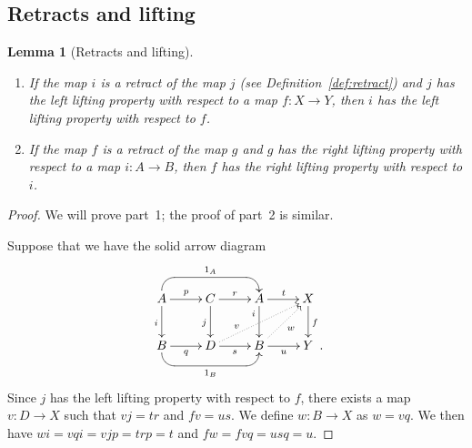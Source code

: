 \documentclass[12pt]{amsart}
\numberwithin{equation}{section}
\theoremstyle{slplain}
\newtheorem{lem}[equation]{Lemma}
\theoremstyle{definition}
\theoremstyle{remark}
\newcommand{\defref}{Definition~\ref}
\newcommand{\Period}{\rlap{\enspace .}}
\begin{document}
\subsection{Retracts and lifting}
\label{sec:RetLft}


\begin{lem}[Retracts and lifting]
  \label{lem:retractLLP}
  \leavevmode
  \begin{enumerate}
  \item If the map $i$ is a retract of the map $j$ (see
    \defref{def:retract}) and $j$ has the left lifting property
    with respect to a map $f\colon X \to Y$, then $i$ has the left
    lifting property with respect to $f$.
  \item If the map $f$ is a retract of the map $g$ and $g$ has the
    right lifting property with respect to a map $i\colon A \to B$,
    then $f$ has the right lifting property with respect to $i$.
  \end{enumerate}
\end{lem}

\begin{proof}
  We will prove part~1; the proof of part~2 is similar.

  Suppose that we have the solid arrow diagram
  \begin{displaymath}
    \xymatrix{
      {A} \ar[r]^{p} \ar[d]_{i} %
           \ar `u[rr] `[drr]^{1_{A}} [rr]+<0pt,6pt>
      & {C} \ar[r]^{r} \ar[d]_{j}
      & {A} \ar[r]^{t} \ar[d]_(.3){i}
      & {X} \ar[d]^{f}\\
      {B} \ar[r]_{q} %
           \ar `d[rr] `[urr]_{1_{B}} [rr]
      & {D} \ar[r]_{s} \ar@{..>}[urr]^(.3){v}
      & {B} \ar[r]_{u} \ar@{..>}[ur]_{w}
      & {Y \Period}
    }
  \end{displaymath}
  Since $j$ has the left lifting property with respect to $f$, there
  exists a map $v\colon D \to X$ such that $vj = tr$ and $fv = us$.
  We define $w\colon B \to X$ as $w = vq$.  We then have $wi = vqi =
  vjp = trp = t$ and $fw = fvq = usq = u$.
\end{proof}
\end{document}
